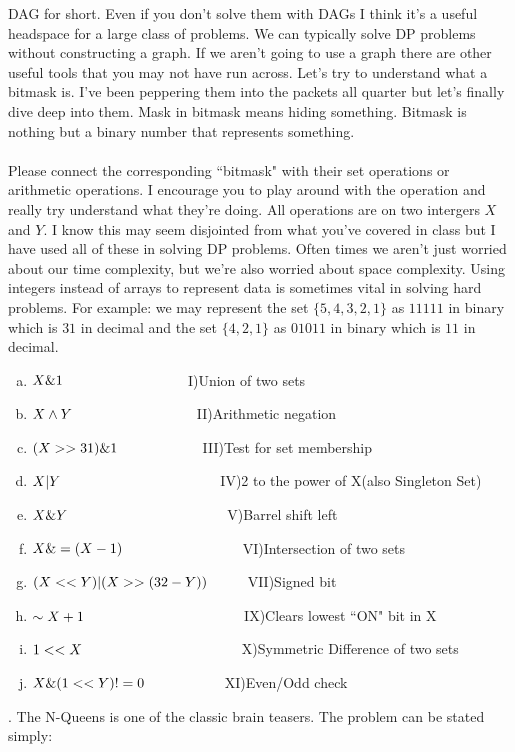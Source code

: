 \documentclass[12pt]{article}
\newcommand\tab[1][1cm]{\hspace*{#1}}
\begin{document}
DAG for short. Even if you don't solve them with DAGs I think it's a useful headspace for a large class of problems. 
We can typically solve DP problems without constructing a graph. If we aren't going to use a graph there are other useful
tools that you may not have run across. Let's try to understand what a bitmask is. I've been peppering
them into the packets all quarter but let's finally dive deep into them. Mask in bitmask means hiding 
something. Bitmask is nothing but a binary number that represents something.\\\\
Please connect the corresponding ``bitmask" with their
set operations or arithmetic operations. I encourage you to 
play around with the operation and really try understand what
they're doing. All operations are on two intergers $X$ and $Y$. 
I know this may seem disjointed from what you've covered in
class but I have used all of these in solving DP problems. 
Often times we aren't just worried about our time complexity,
but we're also worried about space complexity. Using integers
instead of arrays to represent data is sometimes vital in solving
hard problems. For example: we may represent the set $\{5,4,3,2,1\}$ 
as $11111$ in binary which is $31$ in decimal and the set $\{4,2,1\}$ 
as $01011$ in binary which is $11$ in decimal.
\begin{enumerate}[a)]
    \item  $X \& 1 \tab\tab\tab$ I)Union of two sets
    \item  $X \wedge Y \tab\tab\tab$ II)Arithmetic negation
    \item  $ (X >> 31) \& 1 \tab\tab$ III)Test for set membership
    \item  $X | Y \tab\tab\tab\tab$IV)2 to the power of X(also Singleton Set)
    \item  $X \& Y \tab\tab\tab\tab$V)Barrel shift left
    \item  $X \&= (X - 1) \tab\tab\tab$VI)Intersection of two sets
    \item  $(X<<Y) | (X >> (32 - Y))\tab$VII)Signed bit
    \item  $ \sim X + 1 \tab\tab\tab\tab$IX)Clears lowest ``ON" bit in X
    \item  $1 << X \tab\tab\tab\tab$X)Symmetric Difference of two sets
    \item  $X \& (1 << Y) != 0 \tab\tab$XI)Even/Odd check 
    \end{enumerate}
\newpage
{}. The N-Queens is one of the classic brain teasers. The problem can be stated simply:
\end{document}
